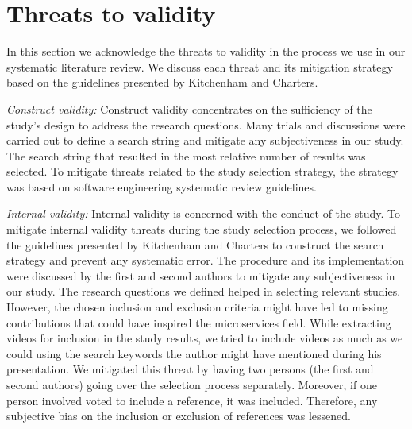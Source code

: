 
\section{Threats to validity}\label{sec:threats}
In this section we acknowledge the threats to validity in the process we use in our systematic
literature review. We discuss each threat and its mitigation strategy based on the guidelines presented by Kitchenham and Charters.\cite{Kitchenham2007}


\textit{Construct validity:} 
Construct validity concentrates on the sufficiency of the study's design to address the research questions. Many trials and discussions were carried out to define a search string and mitigate any subjectiveness in our study. The search string that resulted in the most relative number of results was selected. To mitigate threats related to the study selection strategy, the strategy was based on software engineering systematic review guidelines.\cite{kitchenham2015}

 
\par \textit{Internal validity:} 
Internal validity is concerned with the conduct of the study. To mitigate internal validity threats during the study selection process, we followed the guidelines presented by Kitchenham and Charters\cite{Kitchenham2007} to construct the search strategy and prevent any systematic error.
The procedure and its implementation were discussed by the first and second authors to mitigate any subjectiveness in our study. The research questions we defined helped in selecting relevant studies. However, the chosen inclusion and exclusion criteria might have led to missing contributions that could have inspired the microservices field. While extracting videos for inclusion in the study results, we tried to include videos as much as we could using the search keywords the author might have mentioned during his presentation. We mitigated this threat by having two persons (the first and second authors) going over the selection process separately. Moreover, if one person involved voted to include a reference, it was included. Therefore, any subjective bias on the inclusion or exclusion of references was lessened. 

